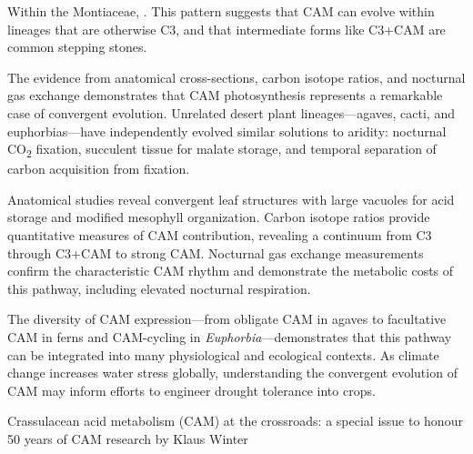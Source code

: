Within the Montiaceae,  . This pattern suggests that CAM can evolve within lineages that are otherwise C3, and that intermediate forms like C3+CAM are common stepping stones.

The evidence from anatomical cross-sections, carbon isotope ratios, and nocturnal gas exchange demonstrates that CAM photosynthesis represents a remarkable case of convergent evolution. Unrelated desert plant lineages---agaves, cacti, and euphorbias---have independently evolved similar solutions to aridity: nocturnal CO\textsubscript{2} fixation, succulent tissue for malate storage, and temporal separation of carbon acquisition from fixation.

Anatomical studies reveal convergent leaf structures with large vacuoles for acid storage and modified mesophyll organization. Carbon isotope ratios provide quantitative measures of CAM contribution, revealing a continuum from C3 through C3+CAM to strong CAM. Nocturnal gas exchange measurements confirm the characteristic CAM rhythm and demonstrate the metabolic costs of this pathway, including elevated nocturnal respiration.

The diversity of CAM expression---from obligate CAM in agaves to facultative CAM in ferns and CAM-cycling in \emph{Euphorbia}---demonstrates that this pathway can be integrated into many physiological and ecological contexts. As climate change increases water stress globally, understanding the convergent evolution of CAM may inform efforts to engineer drought tolerance into crops.

 Crassulacean acid metabolism (CAM) at the crossroads: a special issue to honour 50 years of CAM research by Klaus Winter

